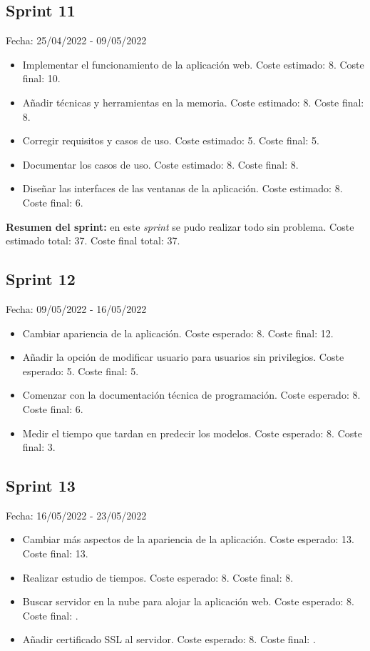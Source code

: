 \subsection{Sprint 11}
Fecha: 25/04/2022 - 09/05/2022
\begin{itemize}
	\item Implementar el funcionamiento de la aplicación web. Coste estimado: 8. Coste final: 10.
	\item Añadir técnicas y herramientas en la memoria. Coste estimado: 8. Coste final: 8.
	\item Corregir requisitos y casos de uso. Coste estimado: 5. Coste final: 5.
	\item Documentar los casos de uso. Coste estimado: 8. Coste final: 8.
	\item Diseñar las interfaces de las ventanas de la aplicación. Coste estimado: 8. Coste final: 6.
\end{itemize}

\textbf{Resumen del sprint:} en este \textit{sprint} se pudo realizar todo sin problema. Coste estimado total: 37. Coste final total: 37.

\subsection{Sprint 12}
Fecha: 09/05/2022 - 16/05/2022
\begin{itemize}
	\item Cambiar apariencia de la aplicación. Coste esperado: 8. Coste final: 12.
	\item Añadir la opción de modificar usuario para usuarios sin privilegios. Coste esperado: 5. Coste final: 5.
	\item Comenzar con la documentación técnica de programación. Coste esperado: 8. Coste final: 6.
	\item Medir el tiempo que tardan en predecir los modelos. Coste esperado: 8. Coste final: 3.
\end{itemize}

\subsection{Sprint 13}
Fecha: 16/05/2022 - 23/05/2022
\begin{itemize}
	\item Cambiar más aspectos de la apariencia de la aplicación. Coste esperado: 13. Coste final: 13.
	\item Realizar estudio de tiempos. Coste esperado: 8. Coste final: 8.
	\item Buscar servidor en la nube para alojar la aplicación web. Coste esperado: 8. Coste final: .
	\item Añadir certificado SSL al servidor. Coste esperado: 8. Coste final: .
\end{itemize}

